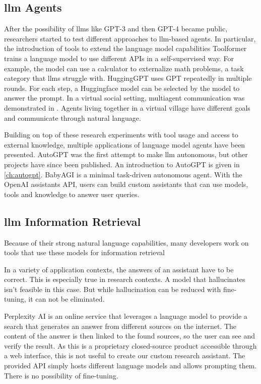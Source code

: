 \documentclass[../main.tex]{subfiles}
\begin{document}
\subsection{\gls{llm} Agents}

After the possibility of \glspl{llm} like GPT-3 and then GPT-4 became public,
researchers started to test different approaches to \gls{llm}-based agents.
In particular, the introduction of tools to extend the language model capabilities
Toolformer \cite{Schick2023} trains a language model to use different APIs in a self-supervised way.
For example, the model can use a calculator to externalize math problems,
a task category that \glspl{llm} struggle with.
HuggingGPT \cite{Shen2023} uses GPT repeatedly in multiple rounds.
For each step, a Huggingface model can be selected by the model to answer the prompt.
In a virtual social setting, multiagent communication was demonstrated in \autocite{Park2023}.
Agents living together in a virtual village have different goals and communicate through natural language.

Building on top of these research experiments with tool usage and access to external knowledge,
multiple applications of language model agents have been presented.
AutoGPT \cite{SignificantGravitas2024} was the first attempt to make \gls{llm} autonomous,
but other projects have since been published.
An introduction to AutoGPT is given in \autoref{ch:autogpt}.
BabyAGI \cite{Nakajima2024} is a minimal task-driven autonomous agent.
With the OpenAI assistants \cite{zotero-195} API,
users can build custom assistants
that can use models, tools and knowledge to answer user queries.


\subsection{\gls{llm} Information Retrieval}

Because of their strong natural language capabilities,
many developers work on tools that use these models for information retrieval

In a variety of application contexts,
the answers of an assistant have to be correct.
This is especially true in research contexts.
A model that hallucinates isn't feasible in this case.
But while hallucination can be reduced with fine-tuning,
it can not be eliminated.

Perplexity AI \cite{zotero-197} is an online service that leverages a language model
to provide a search that generates an answer from different sources on the internet.
The content of the answer is then linked to the found sources,
so the user can see and verify the result.
As this is a proprietary closed-source product accessible through a web interface,
this is not useful to create our custom research assistant.
The provided API simply hosts different language models and allows prompting them.
There is no possibility of fine-tuning.
\end{document}
